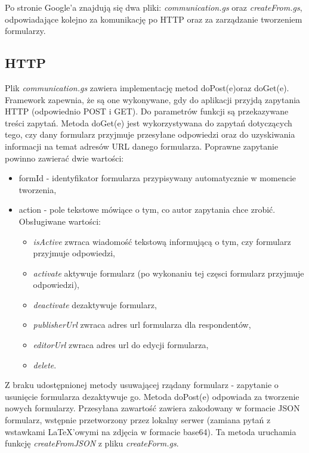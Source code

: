 \ind Po stronie Google'a znajdują się dwa pliki: \textit{communication.gs} oraz \textit{createFrom.gs}, odpowiadające kolejno za komunikację po HTTP oraz za zarządzanie tworzeniem formularzy. 
\subsection{HTTP}
Plik \textit{communication.gs} zawiera implementację metod doPost(e)oraz doGet(e). Framework zapewnia, że są one wykonywane, gdy do aplikacji przyjdą zapytania HTTP (odpowiednio POST i GET). Do parametrów funkcji są przekazywane treści zapytań.
\ind Metoda doGet(e) jest wykorzystywana do zapytań dotyczących tego, czy dany formularz przyjmuje przesyłane odpowiedzi oraz do uzyskiwania informacji na temat adresów URL danego formularza.  Poprawne zapytanie powinno zawierać dwie wartości:
\begin{itemize}
\item formId - identyfikator formularza przypisywany automatycznie w momencie tworzenia,
\item action - pole tekstowe mówiące o tym, co autor zapytania chce zrobić. Obsługiwane wartości:
\begin{itemize}
\item \textit{isActive} zwraca wiadomość tekstową informującą o tym, czy formularz przyjmuje odpowiedzi,
\item \textit{activate} aktywuje formularz (po wykonaniu tej częsci formularz przyjmuje odpowiedzi),
\item \textit{deactivate} dezaktywuje formularz,
\item \textit{publisherUrl} zwraca adres url formularza dla respondentów,
\item \textit{editorUrl} zwraca adres url do edycji formularza,
\item \textit{delete}.
\end{itemize}
\end{itemize}
Z braku udostępnionej metody usuwającej rządany formularz - zapytanie o usunięcie formularza dezaktywuje go. 
\ind Metoda doPost(e) odpowiada  za tworzenie nowych formularzy. Przesyłana zawartość zawiera zakodowany w formacie JSON formularz, wstępnie przetworzony przez lokalny serwer (zamiana pytań z wstawkami \LaTeX{}'owymi na zdjęcia w formacie base64). Ta metoda uruchamia funkcję \textit{createFromJSON} z pliku \textit{createForm.gs}.
